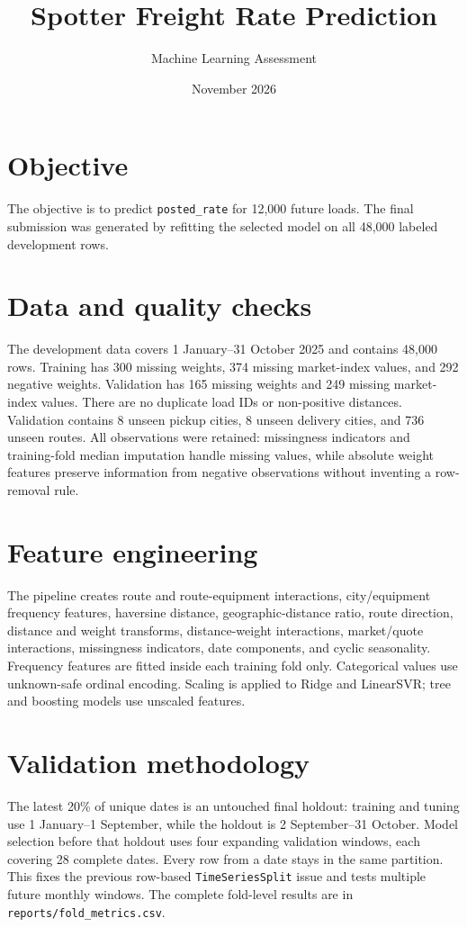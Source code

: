 \documentclass[11pt,a4paper]{article}
\title{\textcolor{spotter}{Spotter Freight Rate Prediction}}
\author{Machine Learning Assessment}
\date{November 2026}
\begin{document}
\maketitle

\section*{Objective}
The objective is to predict \texttt{posted\_rate} for 12,000 future loads.
The final submission was generated by refitting the selected model on all 48,000
labeled development rows.

\section*{Data and quality checks}
The development data covers 1 January--31 October 2025 and contains 48,000
rows. Training has 300 missing weights, 374 missing market-index values, and
292 negative weights. Validation has 165 missing weights and 249 missing
market-index values. There are no duplicate load IDs or non-positive distances.
Validation contains 8 unseen pickup cities, 8 unseen delivery cities, and 736
unseen routes. All observations were retained: missingness indicators and
training-fold median imputation handle missing values, while absolute weight
features preserve information from negative observations without inventing a
row-removal rule.

\section*{Feature engineering}
The pipeline creates route and route-equipment interactions, city/equipment
frequency features, haversine distance, geographic-distance ratio, route
direction, distance and weight transforms, distance-weight interactions,
market/quote interactions, missingness indicators, date components, and cyclic
seasonality. Frequency features are fitted inside each training fold only.
Categorical values use unknown-safe ordinal encoding. Scaling is applied to
Ridge and LinearSVR; tree and boosting models use unscaled features.

\section*{Validation methodology}
The latest 20\% of unique dates is an untouched final holdout: training and
tuning use 1 January--1 September, while the holdout is 2 September--31 October.
Model selection before that holdout uses four expanding validation windows, each
covering 28 complete dates. Every row from a date stays in the same partition.
This fixes the previous row-based \texttt{TimeSeriesSplit} issue and tests
multiple future monthly windows. The complete fold-level results are in
\texttt{reports/fold\_metrics.csv}.
\end{document}
